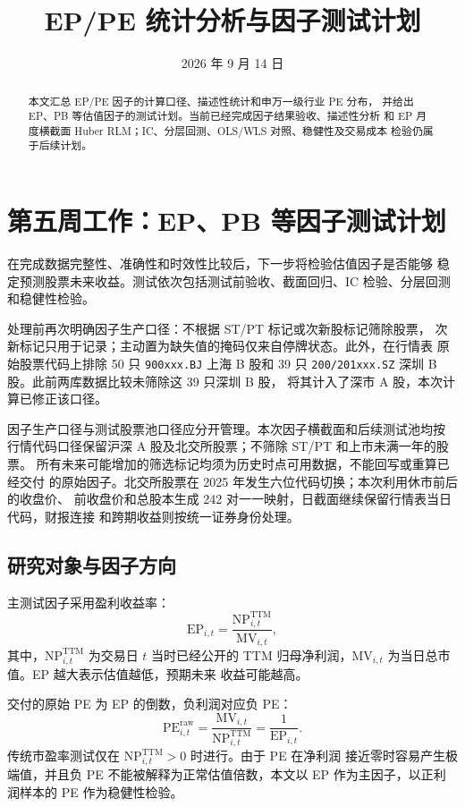 \documentclass[UTF8,a4paper,11pt]{ctexart}
\title{\textbf{EP/PE 统计分析与因子测试计划}}
\author{}
\date{2026 年 9 月 14 日}
\begin{document}
\maketitle

\begin{abstract}
本文汇总 EP/PE 因子的计算口径、描述性统计和申万一级行业 PE 分布，
并给出 EP、PB 等估值因子的测试计划。当前已经完成因子结果验收、描述性分析
和 EP 月度横截面 Huber RLM；IC、分层回测、OLS/WLS 对照、稳健性及交易成本
检验仍属于后续计划。
\end{abstract}

\tableofcontents
\clearpage

\section{第五周工作：EP、PB 等因子测试计划}

在完成数据完整性、准确性和时效性比较后，下一步将检验估值因子是否能够
稳定预测股票未来收益。测试依次包括测试前验收、截面回归、IC 检验、分层回测
和稳健性检验。

处理前再次明确因子生产口径：不根据 ST/PT 标记或次新股标记筛除股票，
次新标记只用于记录；主动置为缺失值的掩码仅来自停牌状态。此外，在行情表
原始股票代码上排除 50 只 \texttt{900xxx.BJ} 上海 B 股和 39 只
\texttt{200/201xxx.SZ} 深圳 B 股。此前两库数据比较未筛除这 39 只深圳 B 股，
将其计入了深市 A 股，本次计算已修正该口径。

因子生产口径与测试股票池口径应分开管理。本次因子横截面和后续测试池均按
行情代码口径保留沪深 A 股及北交所股票；不筛除 ST/PT 和上市未满一年的股票。
所有未来可能增加的筛选标记均须为历史时点可用数据，不能回写或重算已经交付
的原始因子。北交所股票在 2025 年发生六位代码切换；本次利用休市前后的收盘价、
前收盘价和总股本生成 242 对一一映射，日截面继续保留行情表当日代码，财报连接
和跨期收益则按统一证券身份处理。

\subsection{研究对象与因子方向}

主测试因子采用盈利收益率：
\begin{equation}
  \mathrm{EP}_{i,t}
  =\frac{\mathrm{NP}^{\mathrm{TTM}}_{i,t}}{\mathrm{MV}_{i,t}},
\end{equation}
其中，$\mathrm{NP}^{\mathrm{TTM}}_{i,t}$ 为交易日 $t$ 当时已经公开的 TTM
归母净利润，$\mathrm{MV}_{i,t}$ 为当日总市值。EP 越大表示估值越低，预期未来
收益可能越高。

交付的原始 PE 为 EP 的倒数，负利润对应负 PE：
\begin{equation}
  \mathrm{PE}^{\mathrm{raw}}_{i,t}
  =\frac{\mathrm{MV}_{i,t}}{\mathrm{NP}^{\mathrm{TTM}}_{i,t}}
  =\frac{1}{\mathrm{EP}_{i,t}}.
\end{equation}
传统市盈率测试仅在 $\mathrm{NP}^{\mathrm{TTM}}_{i,t}>0$ 时进行。由于 PE 在净利润
接近零时容易产生极端值，并且负 PE 不能被解释为正常估值倍数，本文以 EP
作为主因子，以正利润样本的 PE 作为稳健性检验。
\end{document}
